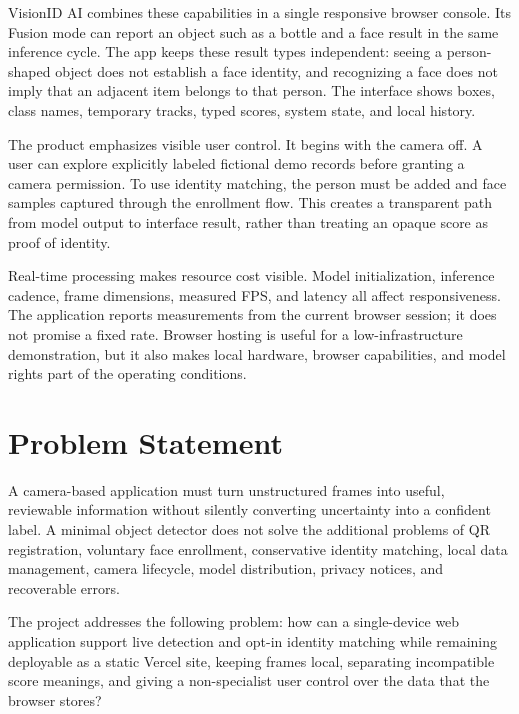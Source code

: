\documentclass[11pt,oneside,openany]{report}
\newcommand{\product}{\textsf{VisionID AI}}
\begin{document}
\product{} combines these capabilities in a single responsive browser console. Its Fusion mode can report an object such as a bottle and a face result in the same inference cycle. The app keeps these result types independent: seeing a person-shaped object does not establish a face identity, and recognizing a face does not imply that an adjacent item belongs to that person. The interface shows boxes, class names, temporary tracks, typed scores, system state, and local history.

The product emphasizes visible user control. It begins with the camera off. A user can explore explicitly labeled fictional demo records before granting a camera permission. To use identity matching, the person must be added and face samples captured through the enrollment flow. This creates a transparent path from model output to interface result, rather than treating an opaque score as proof of identity.

Real-time processing makes resource cost visible. Model initialization, inference cadence, frame dimensions, measured FPS, and latency all affect responsiveness. The application reports measurements from the current browser session; it does not promise a fixed rate. Browser hosting is useful for a low-infrastructure demonstration, but it also makes local hardware, browser capabilities, and model rights part of the operating conditions.

\chapter{Problem Statement}
A camera-based application must turn unstructured frames into useful, reviewable information without silently converting uncertainty into a confident label. A minimal object detector does not solve the additional problems of QR registration, voluntary face enrollment, conservative identity matching, local data management, camera lifecycle, model distribution, privacy notices, and recoverable errors.

The project addresses the following problem: how can a single-device web application support live detection and opt-in identity matching while remaining deployable as a static Vercel site, keeping frames local, separating incompatible score meanings, and giving a non-specialist user control over the data that the browser stores?
\end{document}
